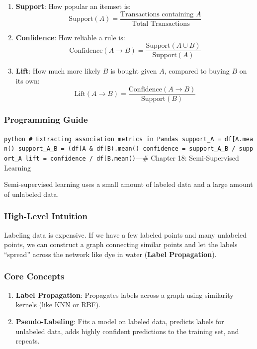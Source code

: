 \begin{enumerate}
\def\labelenumi{\arabic{enumi}.}
\tightlist
\item
  \textbf{Support}: How popular an itemset is:
  \[\text{Support}(A) = \frac{\text{Transactions containing } A}{\text{Total Transactions}}\]
\item
  \textbf{Confidence}: How reliable a rule is:
  \[\text{Confidence}(A \rightarrow B) = \frac{\text{Support}(A \cup B)}{\text{Support}(A)}\]
\item
  \textbf{Lift}: How much more likely \(B\) is bought given \(A\),
  compared to buying \(B\) on its own:
  \[\text{Lift}(A \rightarrow B) = \frac{\text{Confidence}(A \rightarrow B)}{\text{Support}(B)}\]
\end{enumerate}

\subsubsection{Programming Guide}\label{programming-guide-16}

\texttt{python\ \#\ Extracting\ association\ metrics\ in\ Pandas\ support\_A\ =\ df{[}\textquotesingle{}A\textquotesingle{}{]}.mean()\ support\_A\_B\ =\ (df{[}\textquotesingle{}A\textquotesingle{}{]}\ \&\ df{[}\textquotesingle{}B\textquotesingle{}{]}).mean()\ confidence\ =\ support\_A\_B\ /\ support\_A\ lift\ =\ confidence\ /\ df{[}\textquotesingle{}B\textquotesingle{}{]}.mean()}\n\n---\n\n\#
Chapter 18: Semi-Supervised Learning

Semi-supervised learning uses a small amount of labeled data and a large
amount of unlabeled data.

\subsubsection{High-Level Intuition}\label{high-level-intuition-17}

Labeling data is expensive. If we have a few labeled points and many
unlabeled points, we can construct a graph connecting similar points and
let the labels ``spread'' across the network like dye in water
(\textbf{Label Propagation}).

\subsubsection{Core Concepts}\label{core-concepts-10}

\begin{enumerate}
\def\labelenumi{\arabic{enumi}.}
\tightlist
\item
  \textbf{Label Propagation}: Propagates labels across a graph using
  similarity kernels (like KNN or RBF).
\item
  \textbf{Pseudo-Labeling}: Fits a model on labeled data, predicts
  labels for unlabeled data, adds highly confident predictions to the
  training set, and repeats.
\end{enumerate}


